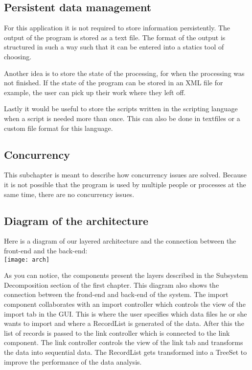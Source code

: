 \documentclass[a4paper,english,fleqn]{exam}
\begin{document}
\subsection{Persistent data management}
For this application it is not required to store information persistently. The output of the program is stored as a text file. The format of the output is structured in such a way such that it can be entered into a statics tool of choosing.

Another idea is to store the state of the processing, for when the processing was not finished. If the state of the program can be stored in an XML file for example, the user can pick up their work where they left off. 

Lastly it would be useful to store the scripts written in the scripting language when a script is needed more than once. This can also be done in textfiles or a custom file format for this language. 

\subsection{Concurrency}
This subchapter is meant to describe how concurrency issues are solved. Because it is not possible that the program is used by multiple people or processes at the same time, there are no concurrency issues.  
\newpage

\subsection{Diagram of the architecture}

Here is a diagram of our layered architecture and the connection between the front-end and the back-end: \\

\texttt{[image: arch]}

As you can notice, the components present the layers described in the Subsystem Decomposition section of the first chapter. This diagram also shows the connection between the frond-end and back-end of the system. The import component collaborates with an import controller which controls the view of the import tab in the GUI. This is where the user specifies which data files he or she wants to import and where a RecordList is generated of the data. After this the list of records is passed to the link controller which is connected to the link component. The link controller controls the view of the link tab and transforms the data into sequential data. The RecordList gets transformed into a TreeSet to improve the performance of the data analysis. 
\end{document}
